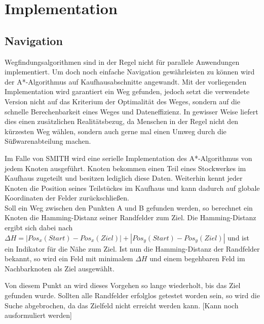 \section{Implementation}

\subsection{Navigation}
Wegfindungsalgorithmen sind in der Regel nicht für parallele Anwendungen implementiert. Um doch noch einfache Navigation gewährleisten zu können wird der A*-Algorithmus auf Kaufhausabschnitte angewandt. Mit der vorliegenden Implementation wird garantiert ein Weg gefunden, jedoch setzt die verwendete Version nicht auf das Kriterium der Optimalität des Weges, sondern auf die schnelle Berechenbarkeit eines Weges und Dateneffizienz. In gewisser Weise liefert dies einen zusätzlichen Realitätsbezug, da Menschen in der Regel nicht den kürzesten Weg wählen, sondern auch gerne mal einen Umweg durch die Süßwarenabteilung machen.

Im Falle von SMITH wird eine serielle Implementation des A*-Algorithmus von jedem Knoten ausgeführt. Knoten bekommen einen Teil eines Stockwerkes im Kaufhaus zugeteilt und besitzen lediglich diese Daten. Weiterhin kennt jeder Knoten die Position seines Teilstückes im Kaufhaus und kann dadurch auf globale Koordinaten der Felder zurückschließen.\\
Soll ein Weg zwischen den Punkten A und B gefunden werden, so berechnet ein Knoten die Hamming-Distanz seiner Randfelder zum Ziel. Die Hamming-Distanz ergibt sich dabei nach $\Delta H = |Pos_x(Start)-Pos_x(Ziel)| + |Pos_y(Start)-Pos_y(Ziel)|$ und ist ein Indikator für die Nähe zum Ziel.
Ist nun die Hamming-Distanz der Randfelder bekannt, so wird ein Feld mit minimalem $\Delta H$ und einem begehbaren Feld im Nachbarknoten als Ziel ausgewählt.

Von diesem Punkt an wird dieses Vorgehen so lange wiederholt, bis das Ziel gefunden wurde. Sollten alle Randfelder erfolglos getestet worden sein, so wird die Suche abgebrochen, da das Zielfeld nicht erreicht werden kann. [Kann noch ausformuliert werden]

